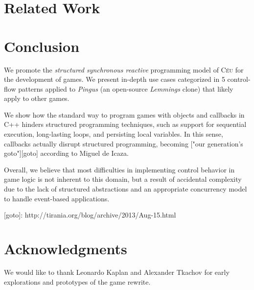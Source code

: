 \documentclass{vgtc}                          %
\newcommand{\CEU}{\textsc{C\'{e}u}\xspace}
\begin{document}
\section{Related Work}

\section{Conclusion}

We promote the \emph{structured synchronous reactive} programming model of
\CEU for the development of games.
We present in-depth use cases categorized in 5 control-flow patterns applied to
\emph{Pingus} (an open-source \emph{Lemmings} clone) that likely apply to other
games.

We show how the standard way to program games with objects and callbacks in C++
hinders structured programming techniques, such as support for sequential
execution, long-lasting loops, and persisting local variables.
In this sense, callbacks actually disrupt structured programming, becoming
["our generation’s goto"][goto] according to Miguel de Icaza.

Overall, we believe that most difficulties in implementing control behavior in 
game logic is not inherent to this domain, but a result of accidental
complexity due to the lack of structured abstractions and an appropriate
concurrency model to handle event-based applications.

[goto]: http://tirania.org/blog/archive/2013/Aug-15.html

\section{Acknowledgments}

We would like to thank Leonardo Kaplan and Alexander Tkachov for early
explorations and prototypes of the game rewrite.



\end{document}
